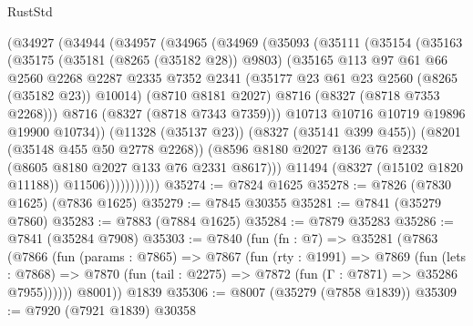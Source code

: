 \begin{lexlean}{RustStd}
\begin{coremodule}
{\begin{coremodule}
{{{{{{{{{{{{{{{{{{{{{{{{{{{{{{{{{{{{{{{{{{{{{{{{{{{{{{              (@34927
                (@34944
                  (@34957
                    (@34965
                      (@34969
                        (@35093
                          (@35111
                            (@35154
                              (@35163
                                (@35175
                                  (@35181 (@8265 (@35182 @28)) @9803)
                                  (@35165
                                    @113
                                    @97
                                    @61
                                    @66
                                    @2560
                                    @2268
                                    @2287
                                    @2335
                                    @7352
                                    @2341
                                    (@35177 @23 @61 @23 @2560 (@8265 (@35182 @23)) @10014)
                                    (@8710 @8181 @2027)
                                    @8716
                                    (@8327 (@8718 @7353 @2268)))
                                  @8716
                                  (@8327 (@8718 @7343 @7359)))
                                @10713
                                @10716
                                @10719
                                @19896
                                @19900
                                @10734))
                            (@11328 (@35137 @23))
                            (@8327 (@35141 @399 @455))
                            (@8201 (@35148 @455 @50 @2778 @2268))
                            (@8596
                              @8180
                              @2027
                              @136
                              @76
                              @2332
                              (@8605 @8180 @2027 @133 @76 @2331 @8617)))
                          @11494
                          (@8327 (@15102 @1820 @11188))
                          @11506)))))))))))
@35274 := @7824 @1625
@35278 := @7826 (@7830 @1625) (@7836 @1625)
@35279 := @7845 @30355
@35281 := @7841 (@35279 @7860)
@35283 := @7883 (@7884 @1625)
@35284 := @7879 @35283
@35286 := @7841 (@35284 @7908)
@35303 := @7840
    (fun (fn : @7) =>
    @35281
      (@7863
        (@7866
          (fun (params : @7865) =>
          @7867
            (fun (rty : @1991) =>
            @7869
              (fun (lets : @7868) =>
              @7870 (fun (tail : @2275) => @7872 (fun (Γ : @7871) => @35286 @7955))))))
        @8001))
    @1839
@35306 := @8007 (@35279 (@7858 @1839))
@35309 := @7920 (@7921 @1839) @30358
}}}}}}}}}}}}}}}}}}}}}}}}}}}}}}}}}}}}}}}}}}}}}}}}}}}}}}
\end{coremodule}}
\end{coremodule}
\end{lexlean}
